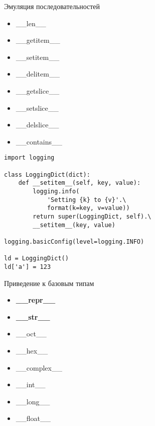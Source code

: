 \documentclass[hyperref={pdftex,unicode}]{beamer}
\begin{document}
\begin{frame}[fragile]{Эмуляция последовательностей}
  \begin{minipage}{0.3\linewidth}
    \begin{itemize}
    \item \_\_len\_\_
    \item \_\_getitem\_\_
    \item \_\_setitem\_\_
    \item \_\_delitem\_\_
    \item \_\_getslice\_\_
    \item \_\_setslice\_\_
    \item \_\_delslice\_\_
    \item \_\_contains\_\_
    \end{itemize}
  \end{minipage}
  \hfill
  \begin{minipage}{0.65\linewidth}
    \begin{lstlisting}[basicstyle=\scriptsize\ttfamily]
import logging

class LoggingDict(dict):
    def __setitem__(self, key, value):
        logging.info(
            'Setting {k} to {v}'.\
            format(k=key, v=value))
        return super(LoggingDict, self).\
        __setitem__(key, value)

logging.basicConfig(level=logging.INFO)

ld = LoggingDict()
ld['a'] = 123
      \end{lstlisting}
  \end{minipage}
\end{frame}

\begin{frame}{Приведение к базовым типам}
  \begin{itemize}
  \item \textbf{\_\_repr\_\_}
  \item \textbf{\_\_str\_\_}
  \item \_\_oct\_\_
  \item \_\_hex\_\_
  \item \_\_complex\_\_
  \item \_\_int\_\_
  \item \_\_long\_\_
  \item \_\_float\_\_
  \end{itemize}\
\end{frame}
\end{document}
